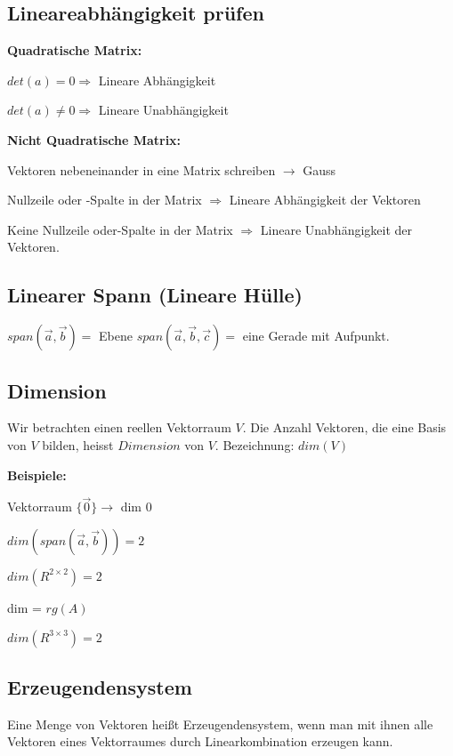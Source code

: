 \begin{multicols*}{3}
    \subsection{Lineareabhängigkeit prüfen}
    {\textbf{Quadratische Matrix:} }

    {$det(a) = 0 \Rightarrow$ Lineare Abhängigkeit}

    {$det(a) \neq 0 \Rightarrow$  Lineare Unabhängigkeit}

    {\textbf{Nicht Quadratische Matrix:} }

    { Vektoren nebeneinander in eine Matrix schreiben $\rightarrow$ Gauss  }

    { {\small Nullzeile oder -Spalte in der Matrix} $\Longrightarrow$ Lineare Abhängigkeit der Vektoren}

    { {\small Keine Nullzeile oder-Spalte in der Matrix} $\Longrightarrow$ Lineare Unabhängigkeit der Vektoren.}
    \subsection{Linearer Spann (Lineare Hülle)}
    {$span(\vec{a},\vec{b}) = $ Ebene}
    {$span(\vec{a},\vec{b},\vec{c}) = $ eine Gerade mit Aufpunkt.}


    \subsection{Dimension}
    { Wir betrachten einen reellen Vektorraum $V$.
        Die Anzahl Vektoren, die eine Basis von $V$ bilden, heisst $Dimension$ von $V$.
    }
    {Bezeichnung: $dim(V)$}

    {\textbf{Beispiele:} }
    \begin{multicols}{2}
        {Vektorraum $\{ \vec{0} \} \rightarrow $ dim $0$}

        {$dim(span(\vec{a},\vec{b})) = 2$}

        {$dim(R^{2 \times 2})=2$}
        \columnbreak

        {dim = $rg(A)$}

        {$dim(R^{3 \times 3})=2$}

    \end{multicols}




    \subsection{Erzeugendensystem}
    {Eine Menge von Vektoren heißt Erzeugendensystem, wenn man mit ihnen alle Vektoren eines Vektorraumes durch Linearkombination erzeugen kann.}


\end{multicols*}
